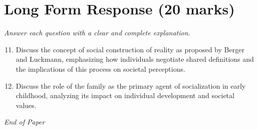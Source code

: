 \documentclass[12pt]{article}
\begin{document}
\section*{Long Form Response (20 marks)}
\textit{Answer each question with a clear and complete explanation.}
\begin{enumerate}[label=\arabic*.]
\setcounter{enumi}{10}
\item Discuss the concept of social construction of reality as proposed by Berger and Luckmann, emphasizing how individuals negotiate shared definitions and the implications of this process on societal perceptions.
\item Discuss the role of the family as the primary agent of socialization in early childhood, analyzing its impact on individual development and societal values.
\end{enumerate}

\vfill
\noindent\textit{End of Paper}
\end{document}
